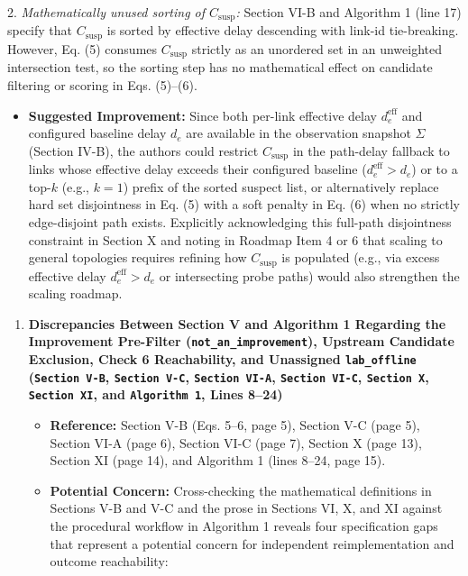 \documentclass[11pt,a4paper]{article}
\begin{document}
2. \emph{Mathematically unused sorting of $C_{\text{susp}}$:} Section VI-B and Algorithm 1 (line 17) specify that $C_{\text{susp}}$ is sorted by effective delay descending with link-id tie-breaking. However, Eq. (5) consumes $C_{\text{susp}}$ strictly as an unordered set in an unweighted intersection test, so the sorting step has no mathematical effect on candidate filtering or scoring in Eqs. (5)–(6).
\begin{itemize}[leftmargin=1.8em,itemsep=2pt]
\item \textbf{Suggested Improvement:} Since both per-link effective delay $d_e^{\text{eff}}$ and configured baseline delay $d_e$ are available in the observation snapshot $\Sigma$ (Section IV-B), the authors could restrict $C_{\text{susp}}$ in the path-delay fallback to links whose effective delay exceeds their configured baseline ($d_e^{\text{eff}} > d_e$) or to a top-$k$ (e.g., $k=1$) prefix of the sorted suspect list, or alternatively replace hard set disjointness in Eq. (5) with a soft penalty in Eq. (6) when no strictly edge-disjoint path exists. Explicitly acknowledging this full-path disjointness constraint in Section X and noting in Roadmap Item 4 or 6 that scaling to general topologies requires refining how $C_{\text{susp}}$ is populated (e.g., via excess effective delay $d_e^{\text{eff}} > d_e$ or intersecting probe paths) would also strengthen the scaling roadmap.
\end{itemize}
\begin{enumerate}[leftmargin=1.6em,itemsep=3pt]
\item \textbf{Discrepancies Between Section V and Algorithm 1 Regarding the Improvement Pre-Filter (\texttt{not\_an\_improvement}), Upstream Candidate Exclusion, Check 6 Reachability, and Unassigned \texttt{lab\_offline} (\texttt{Section V-B}, \texttt{Section V-C}, \texttt{Section VI-A}, \texttt{Section VI-C}, \texttt{Section X}, \texttt{Section XI}, and \texttt{Algorithm 1}, Lines 8–24)}
\begin{itemize}[leftmargin=1.8em,itemsep=2pt]
\item \textbf{Reference:} Section V-B (Eqs. 5–6, page 5), Section V-C (page 5), Section VI-A (page 6), Section VI-C (page 7), Section X (page 13), Section XI (page 14), and Algorithm 1 (lines 8–24, page 15).
\item \textbf{Potential Concern:} Cross-checking the mathematical definitions in Sections V-B and V-C and the prose in Sections VI, X, and XI against the procedural workflow in Algorithm 1 reveals four specification gaps that represent a potential concern for independent reimplementation and outcome reachability:
\end{itemize}
\end{enumerate}
\end{document}
